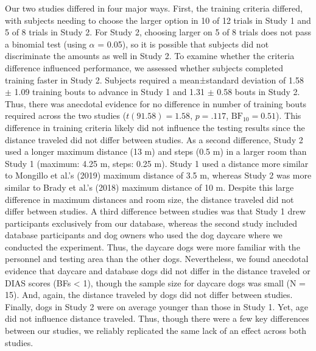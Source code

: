 \documentclass[
  pub,floatsintext]{apa6}
\begin{document}
Our two studies differed in four major ways. First, the training criteria differed, with subjects needing to choose the larger option in 10 of 12 trials in Study 1 and 5 of 8 trials in Study 2. For Study 2, choosing larger on 5 of 8 trials does not pass a binomial test (using \(\alpha\) = 0.05), so it is possible that subjects did not discriminate the amounts as well in Study 2. To examine whether the criteria difference influenced performance, we assessed whether subjects completed training faster in Study 2. Subjects required a mean±standard deviation of 1.58 \(\pm\) 1.09 training bouts to advance in Study 1 and 1.31 \(\pm\) 0.58 bouts in Study 2. Thus, there was anecdotal evidence for no difference in number of training bouts required across the two studies (\(t(91.58) = 1.58\), \(p = .117\), \(\mathrm{BF}_{\textrm{10}} = 0.51\)). This difference in training criteria likely did not influence the testing results since the distance traveled did not differ between studies. As a second difference, Study 2 used a longer maximum distance (13 m) and steps (0.5 m) in a larger room than Study 1 (maximum: 4.25 m, steps: 0.25 m). Study 1 used a distance more similar to Mongillo et al.'s (2019) maximum distance of 3.5 m, whereas Study 2 was more similar to Brady et al.'s (2018) maximum distance of 10 m. Despite this large difference in maximum distances and room size, the distance traveled did not differ between studies. A third difference between studies was that Study 1 drew participants exclusively from our database, whereas the second study included database participants and dog owners who used the dog daycare where we conducted the experiment. Thus, the daycare dogs were more familiar with the personnel and testing area than the other dogs. Nevertheless, we found anecdotal evidence that daycare and database dogs did not differ in the distance traveled or DIAS scores (BFs \textless{} 1), though the sample size for daycare dogs was small (N = 15). And, again, the distance traveled by dogs did not differ between studies. Finally, dogs in Study 2 were on average younger than those in Study 1. Yet, age did not influence distance traveled. Thus, though there were a few key differences between our studies, we reliably replicated the same lack of an effect across both studies.
\end{document}
